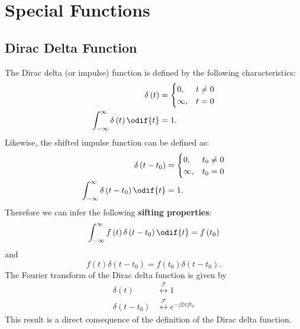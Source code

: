 \documentclass{article}
\begin{document}
\section{Special Functions}
\subsection{Dirac Delta Function}
The Dirac delta (or impulse) function is defined by the following
characteristics:
\begin{align*}
    \delta\left( t \right)                                & =
    \begin{cases}
        0,      & t \neq 0 \\
        \infty, & t = 0
    \end{cases}
    \\
    \int_{-\infty}^\infty \delta\left( t \right) \odif{t} & = 1.
\end{align*}
Likewise, the shifted impulse function can be defined as:
\begin{align*}
    \delta\left( t - t_0 \right)                                & =
    \begin{cases}
        0,      & t_0 \neq 0 \\
        \infty, & t_0 = 0
    \end{cases}
    \\
    \int_{-\infty}^\infty \delta\left( t - t_0 \right) \odif{t} & = 1.
\end{align*}
Therefore we can infer the following \textbf{sifting properties}:
\begin{equation*}
    \int_{-\infty}^\infty f\left( t \right) \delta\left( t - t_0 \right) \odif{t} = f\left( t_0 \right)
\end{equation*}
and
\begin{equation*}
    f\left( t \right) \delta\left( t - t_0 \right) = f\left( t_0 \right) \delta\left( t - t_0 \right).
\end{equation*}
The Fourier transform of the Dirac delta function is given by
\begin{align*}
    \delta\left( t \right)       & \overset{\mathscr{F}}{\longleftrightarrow} 1                 \\
    \delta\left( t - t_0 \right) & \overset{\mathscr{F}}{\longleftrightarrow} e^{-j 2\pi f t_0}
\end{align*}
This result is a direct consequence of the definition of the Dirac delta function.
\end{document}

